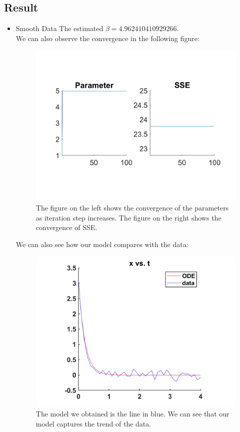 \documentclass{article}
\begin{document}
\subsection{Result}
\begin{itemize}
\item Smooth Data
The estimated $\beta=4.962410410929266$.\\
We can also observe the convergence in the following figure:
\begin{figure}[H]
\centering
\includegraphics[scale=0.3]{figures/p_b_conv.png}
\caption{The figure on the left shows the convergence of the parameters as iteration step increases. The figure on the right shows the convergence of SSE.}
\end{figure}

We can also see how our model compares with the data:
\begin{figure}[H]
\centering
\includegraphics[scale=0.2]{figures/p_b_data.png}
\caption{The model we obtained is the line in blue. We can see that our model captures the trend of the data.}
\end{figure}


\end{itemize}
\end{document}
